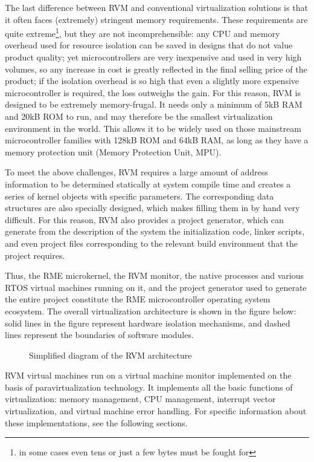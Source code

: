 The last difference between RVM and conventional virtualization solutions is that it often faces (extremely) stringent memory requirements. These requirements are quite extreme\footnote{in some cases even tens or just a few bytes must be fought for}, but they are not incomprehensible: any CPU and memory overhead used for resource isolation can be saved in designs that do not value product quality; yet microcontrollers are very inexpensive and used in very high volumes, so any increase in cost is greatly reflected in the final selling price of the product; if the isolation overhead is so high that even a slightly more expensive microcontroller is required, the loss outweighs the gain. For this reason, RVM is designed to be extremely memory-frugal. It needs only a minimum of 5kB
RAM and 20kB
ROM to run, and may therefore be the smallest virtualization environment in the world. This allows it to be widely used on those mainstream microcontroller families with 128kB
ROM and 64kB RAM, as long as they have a memory protection unit (Memory
Protection Unit, MPU).

To meet the above challenges, RVM requires a large amount of address information to be determined statically at system compile time and creates a series of kernel objects with specific parameters. The corresponding data structures are also specially designed, which makes filling them in by hand very difficult. For this reason, RVM also provides a project generator, which can generate from the description of the system the initialization code, linker scripts, and even project files corresponding to the relevant build environment that the project requires.

Thus, the RME microkernel, the RVM monitor, the native processes and various RTOS virtual machines running on it, and the project generator used to generate the entire project constitute the RME microcontroller operating system ecosystem. The overall virtualization architecture is shown in the figure below: solid lines in the figure represent hardware isolation mechanisms, and dashed lines represent the boundaries of software modules.


\begin{figure}[htbp]
\centering
\resizebox{\textwidth}{!}{}
\caption{Simplified diagram of the RVM architecture}\label{fig:2-1}
\end{figure}


RVM virtual machines run on a virtual machine monitor implemented on the basis of paravirtualization technology. It implements all the basic functions of virtualization: memory management, CPU management, interrupt vector virtualization, and virtual machine error handling. For specific information about these implementations, see the following sections.

